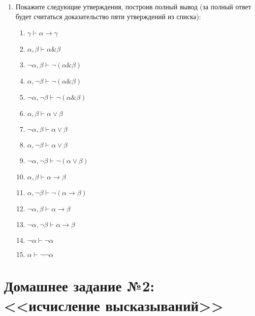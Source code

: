 \documentclass[10pt,a4paper,oneside]{article}
\begin{document}
\begin{enumerate}
\item Покажите следующие утверждения, построив полный вывод (за полный
ответ будет считаться доказательство пяти утверждений из списка):
\begin{enumerate}
\item $\gamma \vdash \alpha\to\gamma$
\item $\alpha,\beta \vdash \alpha\&\beta$
\item $\neg\alpha,\beta \vdash \neg(\alpha\&\beta)$
\item $\alpha,\neg\beta \vdash \neg(\alpha\&\beta)$
\item $\neg\alpha,\neg\beta \vdash \neg(\alpha\&\beta)$
\item $\alpha,\beta \vdash \alpha\vee\beta$
\item $\neg\alpha,\beta \vdash \alpha\vee\beta$
\item $\alpha,\neg\beta \vdash \alpha\vee\beta$
\item $\neg\alpha,\neg\beta \vdash \neg(\alpha\vee\beta)$
\item $\alpha,\beta \vdash \alpha\rightarrow\beta$
\item $\alpha,\neg\beta \vdash \neg(\alpha\rightarrow\beta)$
\item $\neg\alpha,\beta \vdash \alpha\rightarrow\beta$
\item $\neg\alpha,\neg\beta \vdash \alpha\rightarrow\beta$
\item $\neg\alpha \vdash \neg\alpha$
\item $\alpha \vdash \neg\neg\alpha$
\end{enumerate}
\end{enumerate}

\section*{Домашнее задание №2: <<исчисление высказываний>>}
\end{document}
